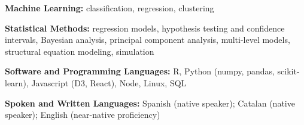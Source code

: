 \begin{cventries}
  \cventry
    {}
    {}
    {}
    {}
    {
      \begin{cvitems}
        \item {\textbf{Machine Learning:} classification, regression, clustering}
        \item {\textbf{Statistical Methods:} regression models, hypothesis testing and confidence intervals, Bayesian analysis, principal component analysis, multi-level models, structural equation modeling, simulation}
        \item {\textbf{Software and Programming Languages:} R, Python (numpy, pandas, scikit-learn), Javascript (D3, React), Node, Linux, SQL}
        \item {\textbf{Spoken and Written Languages:} Spanish (native speaker); Catalan (native speaker); English (near-native proficiency)}
      \end{cvitems}
    }
\end{cventries}
